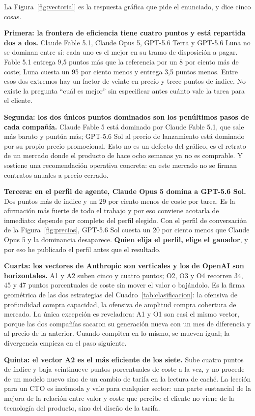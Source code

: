 \documentclass[11pt,letterpaper]{article}
\begin{document}
La Figura~\ref{fig:vectorial} es la respuesta gráfica que pide el enunciado, y
dice cinco cosas.

\textbf{Primera: la frontera de eficiencia tiene cuatro puntos y está repartida
dos a dos.} Claude Fable 5.1, Claude Opus 5, GPT-5.6 Terra y GPT-5.6 Luna no se
dominan entre sí: cada uno es el mejor en su tramo de disposición a pagar. Fable
5.1 entrega 9,5 puntos más que la referencia por un 8 por ciento más de coste;
Luna cuesta un 95 por ciento menos y entrega 3,5 puntos menos. Entre esos dos
extremos hay un factor de veinte en precio y trece puntos de índice. No existe
la pregunta \enquote{cuál es mejor} sin especificar antes cuánto vale la tarea
para el cliente.

\textbf{Segunda: los dos únicos puntos dominados son los penúltimos pasos de cada
compañía.} Claude Fable 5 está dominado por Claude Fable 5.1, que sale más barato
y puntúa más; GPT-5.6 Sol al precio de lanzamiento está dominado por su propio
precio promocional. Esto no es un defecto del gráfico, es el retrato de un mercado
donde el producto de hace ocho semanas ya no es comprable. Y sostiene una
recomendación operativa concreta: en este mercado no se firman contratos anuales
a precio cerrado.

\textbf{Tercera: en el perfil de agente, Claude Opus 5 domina a GPT-5.6 Sol.}
Dos puntos más de índice y un 29 por ciento menos de coste por tarea. Es la
afirmación más fuerte de todo el trabajo y por eso conviene acotarla de
inmediato: depende por completo del perfil elegido. Con el perfil de
conversación de la Figura~\ref{fig:precios}, GPT-5.6 Sol cuesta un 20 por ciento
menos que Claude Opus 5 y la dominancia desaparece. \textbf{Quien elija el perfil,
elige el ganador}, y por eso he publicado el perfil antes que el resultado.

\textbf{Cuarta: los vectores de Anthropic son verticales y los de OpenAI son
horizontales.} A1 y A2 suben cinco y cuatro puntos; O2, O3 y O4 recorren
34, 45 y 47 puntos porcentuales de coste sin mover el valor o bajándolo. Es la
firma geométrica de las dos estrategias del Cuadro~\ref{tab:clasificacion}: la
ofensiva de profundidad compra capacidad, la ofensiva de amplitud compra
cobertura de mercado. La única excepción es reveladora: A1 y O1 son casi el
mismo vector, porque las dos compañías sacaron su generación nueva con un mes de
diferencia y al precio de la anterior. Cuando compiten en lo mismo, se mueven
igual; la divergencia empieza en el paso siguiente.

\textbf{Quinta: el vector A2 es el más eficiente de los siete.} Sube cuatro
puntos de índice y baja veintinueve puntos porcentuales de coste a la vez, y no
procede de un modelo nuevo sino de un cambio de tarifa en la lectura de caché.
La lección para un CTO es incómoda y vale para cualquier sector: una parte
sustancial de la mejora de la relación entre valor y coste que percibe el cliente
no viene de la tecnología del producto, sino del diseño de la tarifa.
\end{document}
